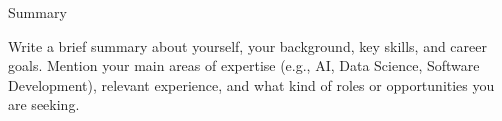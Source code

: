 \begin{rubric}{Summary}
{\large
  \parbox{\textwidth}{
    Write a brief summary about yourself, your background, key skills, and career goals. 
    Mention your main areas of expertise (e.g., AI, Data Science, Software Development), 
    relevant experience, and what kind of roles or opportunities you are seeking.
  }
\par}
\end{rubric}